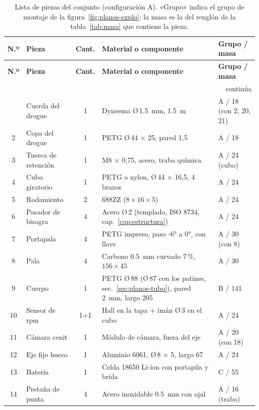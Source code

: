 {\small
\begin{longtable}{@{}c>{\raggedright}p{4.0cm}c>{\raggedright}p{6.0cm}>{\raggedright\arraybackslash}p{2.9cm}@{}}
\caption{Lista de piezas del conjunto (configuración A). «Grupo» indica el grupo de
montaje de la figura~\ref{fig:planos-explo}; la masa es la del renglón de la
tabla~\ref{tab:masa} que contiene la pieza.}\label{tab:planos-piezas}\\
\toprule
\textbf{N.º} & \textbf{Pieza} & \textbf{Cant.} & \textbf{Material o componente} & \textbf{Grupo / masa}\\\midrule
\endfirsthead
\toprule
\textbf{N.º} & \textbf{Pieza} & \textbf{Cant.} & \textbf{Material o componente} & \textbf{Grupo / masa}\\\midrule
\endhead
\midrule\multicolumn{5}{r}{\footnotesize continúa}\\
\endfoot
\bottomrule
\endlastfoot
1  & Cuerda del drogue & 1 & Dyneema Ø\,\SI{1.5}{mm}, \SI{1.5}{m} & A / 18 (con 2, 20, 21)\\
2  & Copa del drogue & 1 & PETG Ø\,44 × 25, pared 1,5 & A / 18\\
3  & Tuerca de retención & 1 & M8 × 0,75, acero, traba química & A / 24 (cubo)\\
4  & Cubo giratorio & 1 & PETG o nylon, Ø\,44 × 16,5, 4 brazos & A / 24\\
5  & Rodamiento & 2 & 688ZZ ($8\times16\times5$) & A / 24\\
6  & Pasador de bisagra & 4 & Acero Ø\,2 (templado, ISO 8734, cap.~\ref{cap:estructura}) & A / 24\\
7  & Portapala & 4 & PETG impreso, paso \ang{-6} a \ang{0}, con llave & A / 30 (con 8)\\
8  & Pala & 4 & Carbono \SI{0.5}{mm} curvado 7\,\%, $156\times45$ & A / 30\\
9  & Cuerpo & 1 & PETG Ø\,88 (Ø\,87 con los patines, sec.~\ref{sec:planos-tubo}), pared \SI{2}{mm}, largo 205 & B / 141\\
10 & Sensor de rpm & 1+1 & Hall en la tapa + imán Ø\,3 en el cubo & A / 24\\
11 & Cámara cenit & 1 & Módulo de cámara, fuera del eje & A / 20 (con 18)\\
12 & Eje fijo hueco & 1 & Aluminio 6061, Ø\,8 × 5, largo 67 & A / 24\\
13 & Batería & 1 & Celda 18650 Li-ion con portapila y brida & C / 55\\
14 & Pestaña de punta & 4 & Acero inoxidable \SI{0.5}{mm} con ojal & A / 16 (traba)\\

\end{longtable}}
